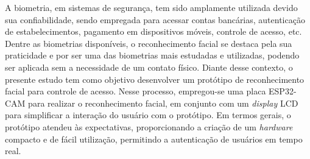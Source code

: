 
\begin{resumoutfpr}%
	A biometria, em sistemas de segurança, tem sido amplamente utilizada devido sua 
	confiabilidade, sendo empregada para acessar contas bancárias, autenticação de 
	estabelecimentos, pagamento em dispositivos móveis, controle de acesso, etc. 
	Dentre as biometrias disponíveis, o reconhecimento facial se destaca pela sua 
	praticidade e por ser uma das biometrias mais estudadas e utilizadas, 
	podendo ser aplicada sem a necessidade de um contato físico. Diante desse contexto,  
	o presente estudo tem como objetivo desenvolver um protótipo de reconhecimento facial 
	para controle de acesso. Nesse processo, empregou-se uma placa ESP32-CAM para 
	realizar o reconhecimento facial, em conjunto com um \textit{display} LCD para simplificar 
	a interação do usuário com o protótipo.  Em termos gerais, o protótipo atendeu às 
	expectativas, proporcionando a criação de um \textit{hardware} compacto e de fácil utilização, 
	permitindo a autenticação de usuários em tempo real.
\end{resumoutfpr}
	